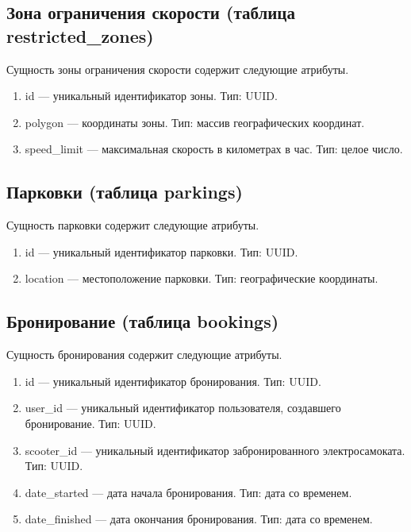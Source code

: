 \subsection*{Зона ограничения скорости (таблица restricted\_zones)}

Сущность зоны ограничения скорости содержит следующие атрибуты.

\begin{enumerate}
	\item id --- уникальный идентификатор зоны. Тип: UUID.
	\item polygon --- координаты зоны. Тип: массив географических координат.
	\item speed\_limit --- максимальная скорость в километрах в час. Тип: целое число.
\end{enumerate}

\subsection*{Парковки (таблица parkings)}

Сущность парковки содержит следующие атрибуты.

\begin{enumerate}
	\item id --- уникальный идентификатор парковки. Тип: UUID.
	\item location --- местоположение парковки. Тип: географические координаты.
\end{enumerate}

\subsection*{Бронирование (таблица bookings)}

Сущность бронирования содержит следующие атрибуты.

\begin{enumerate}
	\item id --- уникальный идентификатор бронирования. Тип: UUID.
	\item user\_id --- уникальный идентификатор пользователя, создавшего бронирование.
	      Тип: UUID.
	\item scooter\_id --- уникальный идентификатор забронированного электросамоката. Тип:
	      UUID.
	\item date\_started --- дата начала бронирования. Тип: дата со временем.
	\item date\_finished --- дата окончания бронирования. Тип: дата со временем.
\end{enumerate}

